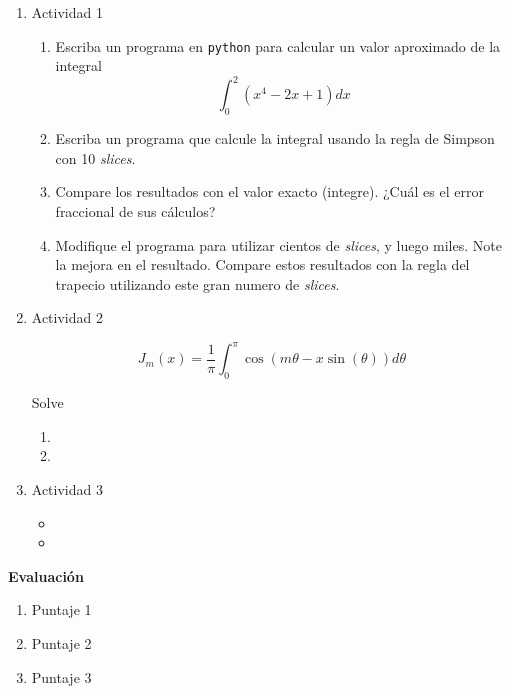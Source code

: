 \documentclass[11pt,letterpaper]{article}
\begin{document}
\begin{enumerate}

\item Actividad 1%

\begin{enumerate}
	\item Escriba un programa en \verb|python| para calcular un valor aproximado de la integral
	\begin{equation}
	\int_0^2\left(x^4 - 2x +1 \right)dx
	\end{equation}
	\item Escriba un programa que calcule la integral usando la regla de Simpson con 10 \textit{slices}.
	\item Compare los resultados con el valor exacto (integre). ¿Cuál es el error fraccional de sus cálculos?
	\item Modifique el programa para utilizar cientos de \textit{slices}, y luego miles. Note la mejora en el resultado. Compare estos resultados con la regla del trapecio utilizando este gran numero de \textit{slices}.
\end{enumerate}

\item Actividad 2%
\lipsum[2]

\noindent

\begin{equation}
J_m(x)=\frac{1}{\pi}\int_0^\pi \cos(m\theta-x\sin(\theta))d\theta
\end{equation}

\noindent
\lipsum[1]

Solve

\begin{enumerate}
	\item \lipsum[66]
	\item \lipsum[75]
\end{enumerate}

\item Actividad 3%

\lipsum[23]
\begin{itemize}
	\item \lipsum[75]
    \item \lipsum[66]
\end{itemize}

\end{enumerate}


\bigskip
\textbf{\large{Evaluación}}

\begin{enumerate}
	\item Puntaje 1
    \item Puntaje 2
    \item Puntaje 3
\end{enumerate}
\end{document}
